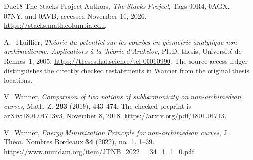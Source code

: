\documentclass[11pt,a4paper]{article}
\numberwithin{equation}{section}
\theoremstyle{definition}
\theoremstyle{remark}
\begin{document}
\begin{thebibliography}{Duc18}
The Stacks Project Authors, \emph{The Stacks Project},
Tags 00R4, 0AGX, 07NY, and 0AVB, accessed November 10, 2026.
\url{https://stacks.math.columbia.edu}.

A.~Thuillier, \emph{Th\'eorie du potentiel sur les courbes en
g\'eom\'etrie analytique non archim\'edienne. Applications
\`a la th\'eorie d'Arakelov}, Ph.D. thesis, Universit\'e de
Rennes~1, 2005.
\url{https://theses.hal.science/tel-00010990}.
The source-access ledger distinguishes the directly checked
restatements in Wanner from the original thesis locations.

V.~Wanner, \emph{Comparison of two notions of subharmonicity
on non-archimedean curves}, Math. Z. \textbf{293} (2019),
443--474. The checked preprint is arXiv:1801.04713v3,
November 8, 2018.
\url{https://arxiv.org/pdf/1801.04713}.

V.~Wanner, \emph{Energy Minimization Principle for
non-archimedean curves}, J. Th\'eor. Nombres Bordeaux
\textbf{34} (2022), no.~1, 1--39.
\url{https://www.numdam.org/item/JTNB_2022__34_1_1_0.pdf}.
\end{thebibliography}

\end{document}
